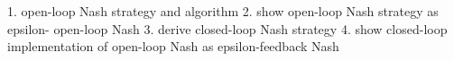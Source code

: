 1. open-loop Nash strategy and algorithm
2. show open-loop Nash strategy as epsilon- open-loop Nash
3. derive closed-loop Nash strategy 
4. show closed-loop implementation of open-loop Nash as epsilon-feedback Nash
